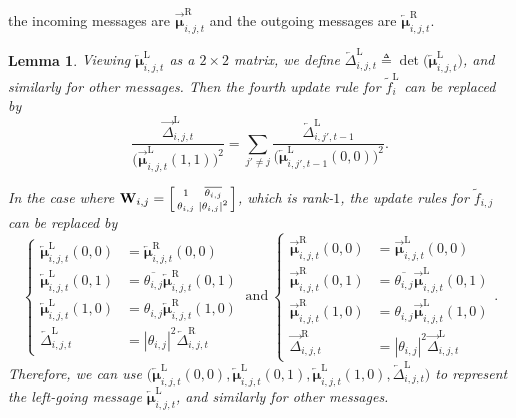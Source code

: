 \documentclass[conference]{IEEEtran}
\theoremstyle{plain}
\newtheorem{lem}[thm]{Lemma}
\theoremstyle{definition}
\newcommand{\tfl}[1]{\widetilde{f}^{\mathrm{L}}_{ #1 }}
\newcommand{\tfe}[1]{\widetilde {f}_{ #1 }}
\newcommand{\muleft}[2]{\overleftarrow{\boldsymbol{\mu}}^{\mathrm{#1}}_{#2}}
\newcommand{\muright}[2]{\overrightarrow{\boldsymbol{\mu}}^{\mathrm{#1}}_{#2}}
\newcommand{\defeq}{\triangleq}
\begin{document}
 the incoming messages are \(\muright{R}{i,j,t}\) and the outgoing messages are \(\muleft{R}{i,j,t}\).
 \begin{lem}
  Viewing $\muleft{L}{i,j,t}$ as a $2\times 2$ matrix, we define
  $\overleftarrow\Delta^{\mathrm{L}}_{i,j,t}\defeq\det\big(\muleft{L}{i,j,t}\big)$,
  and similarly for other messages. Then the fourth update rule for $\tfl{i}$ can be replaced by
  \[
   \frac{\overrightarrow{\Delta}^{\mathrm{L}}_{i,j,t}}{\big(\muright{L}{i,j,t}(1,1)\big)^2}
   =\sum_{j'\neq j}\frac{\overleftarrow{\Delta}^{\mathrm{L}}_{i,j',t-1}}{\big(\muleft{L}{i,j',t-1}(0,0)\big)^2}.
  \]

  In the case where \(\mathbf W_{i,j}= \Bigl[
   \begin{smallmatrix}
    1            & \overline{\theta_{i,j}} \\
    \theta_{i,j} & |\theta_{i,j}|^2
   \end{smallmatrix}
   \Bigr]\), which is rank-$1$, the update rules for $\tfe{i,j}$ can be replaced by
  \begin{equation*}
   \left\{
   \begin{aligned}
    \muleft{L}{i,j,t}(0,0)                    & = \muleft{R}{i,j,t}(0,0)                        \\
    \muleft{L}{i,j,t}(0,1)                    & = \overline{\theta_{i,j}}\muleft{R}{i,j,t}(0,1) \\
    \muleft{L}{i,j,t}(1,0)                    & = {\theta_{i,j}}\muleft{R}{i,j,t}(1,0)          \\
    \overleftarrow{\Delta}^\mathrm{L}_{i,j,t} & =
    |\theta_{i,j}|^2 \overleftarrow{\Delta}^\mathrm{R}_{i,j,t}
   \end{aligned}\right. \ \mathrm{and}\
   \left\{
   \begin{aligned}
    \muright{R}{i,j,t}(0,0)                    & =\muright{L}{i,j,t}(0,0)                        \\
    \muright{R}{i,j,t}(0,1)                    & =\overline{\theta_{i,j}}\muright{L}{i,j,t}(0,1) \\
    \muright{R}{i,j,t}(1,0)                    & ={\theta_{i,j}}\muright{L}{i,j,t}(1,0)          \\
    \overrightarrow{\Delta}^\mathrm{R}_{i,j,t} & =
    |\theta_{i,j}|^2 \overrightarrow{\Delta}^\mathrm{L}_{i,j,t}
   \end{aligned}\right. .
  \end{equation*}
  Therefore, we can use $\big(\muleft{L}{i,j,t}(0,0),\muleft{L}{i,j,t}(0,1),\muleft{L}{i,j,t}(1,0),\overleftarrow{\Delta}^{\mathrm{L}}_{i,j,t}\big)$
  to represent the left-going message $\muleft{L}{i,j,t}$, and similarly for other messages.
 \end{lem}
\end{document}
